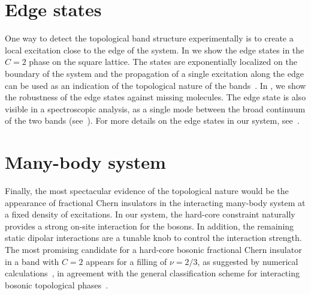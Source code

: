 
\section{Edge states}
One way to detect the topological band structure experimentally is to create a local excitation close to the edge of the system.
In  we show the edge states in the $C=2$ phase on the square lattice.
The states are exponentially localized on the boundary of the system and the propagation of a single excitation along the edge can be used as an indication of the topological nature of the bands~\cite{Hafezi2013}.
In , we show the robustness of the edge states against missing molecules.
The edge state is also visible in a spectroscopic analysis, as a single mode between the broad continuum of the two bands (see~).
For more details on the edge states in our system, see~\cite{Weber2015}. %

\section{Many-body system}
Finally, the most spectacular evidence of the topological nature would be the appearance of fractional Chern insulators in the interacting many-body system at a fixed density of excitations.
In our system, the hard-core constraint naturally provides a strong on-site interaction for the bosons.
In addition, the remaining static dipolar interactions are a tunable knob to control the interaction strength.
The most promising candidate for a hard-core bosonic fractional Chern insulator in a band with $C=2$ appears for a filling of $\nu = 2/3$, as suggested by numerical calculations~\cite{Moller2009,Wang2012a}, in agreement with the general classification scheme for interacting bosonic topological phases~\cite{Lu2012a,Chen2013}.


